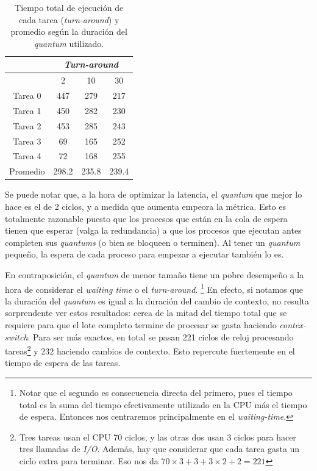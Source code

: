 \begin{table}[H]
  \center
  \begin{center}
  \begin{tabular}{c|c|c|c|}
    \cline{2-4}
    & \multicolumn{3}{|c|}{\cellcolor{LightCyan}\emph{Turn-around}} \\
    \hline
    \rowcolor{LightCyan}
    \multicolumn{1}{|c|}{Quantum} & 2 & 10 & 30 \\
    \hline
    \multicolumn{1}{|c|}{\cellcolor{LightCyan}Tarea 0} & 447 & 279 & 217 \\
    \multicolumn{1}{|c|}{\cellcolor{LightCyan}Tarea 1} & 450 & 282 & 230 \\
    \multicolumn{1}{|c|}{\cellcolor{LightCyan}Tarea 2} & 453 & 285 & 243 \\
    \multicolumn{1}{|c|}{\cellcolor{LightCyan}Tarea 3} & 69 & 165 & 252 \\
    \multicolumn{1}{|c|}{\cellcolor{LightCyan}Tarea 4} & 72 & 168 & 255 \\
    \hline
    \multicolumn{1}{|c|}{\cellcolor{LightCyan}Promedio} & 298.2 & 235.8 & 239.4 \\
    \hline
  \end{tabular}
  \end{center}
  \caption{\footnotesize Tiempo total de ejecución de cada tarea (\emph{turn-around}) y promedio según la duración del \emph{quantum} utilizado.}
  \label{tab:ej5-3}
\end{table}


Se puede notar que, a la hora de optimizar la latencia, el \emph{quantum} que mejor lo hace es el de 2 ciclos, y a medida que aumenta empeora la métrica. Esto es totalmente razonable puesto que los procesos que están en la cola de espera tienen que esperar (valga la redundancia) a que los procesos que ejecutan antes completen sus \emph{quantums} (o bien se bloqueen o terminen). Al tener un \emph{quantum} pequeño, la espera de cada proceso para empezar a ejecutar también lo es.

En contraposición, el \emph{quantum} de menor tamaño tiene un pobre desempeño a la hora de considerar el \emph{waiting time} o el \emph{turn-around}. \footnote{Notar que el segundo es consecuencia directa del primero, pues el tiempo total es la suma del tiempo efectivamente utilizado en la CPU más el tiempo de espera. Entonces nos centraremos principalmente en el \emph{waiting-time}.} En efecto, si notamos que la duración del \emph{quantum} es igual a la duración del cambio de contexto, no resulta sorprendente ver estos resultados: cerca de la mitad del tiempo total que se requiere para que el lote completo termine de procesar se gasta haciendo \emph{contex-switch}. Para ser más exactos, en total se pasan 221 ciclos de reloj procesando tareas\footnote{Tres tareas usan el CPU 70 ciclos, y las otras dos usan 3 ciclos para hacer tres llamadas de \emph{I/O}. Además, hay que considerar que cada tarea gasta un ciclo extra para terminar. Eso nos da $70\times 3 + 3 + 3\times 2 + 2 = 221$} y 232 haciendo cambios de contexto. Esto repercute fuertemente en el tiempo de espera de las tareas.

